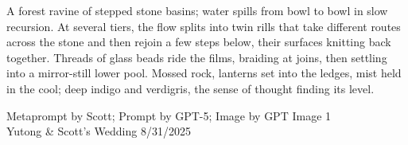 \documentclass[12pt]{article}
\begin{document}
\noindent
\begin{adjustbox}{max size={\textwidth}{\textheight}}
\begin{varwidth}{\textwidth}
\RaggedRight
\footnotesize
A forest ravine of stepped stone basins; water spills from bowl to bowl in slow recursion. At several tiers, the flow splits into twin rills that take different routes across the stone and then rejoin a few steps below, their surfaces knitting back together. Threads of glass beads ride the films, braiding at joins, then settling into a mirror-still lower pool. Mossed rock, lanterns set into the ledges, mist held in the cool; deep indigo and verdigris, the sense of thought finding its level.
\end{varwidth}
\end{adjustbox}
\vfill
{\raggedleft\footnotesize
Metaprompt by Scott; Prompt by GPT-5; Image by GPT Image 1 \\
Yutong \& Scott's Wedding 8/31/2025\par}
\end{document}
